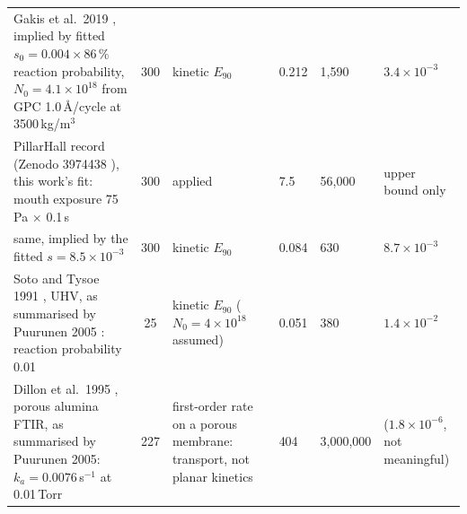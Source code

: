 \documentclass[11pt,letterpaper]{article}
\begin{document}
\begin{table}[tbp]
\begin{tabular}{P{2.15in}cP{0.9in}P{0.65in}P{0.7in}P{0.85in}}
Gakis et al.\ 2019 \cite{gakis2019}, implied by fitted $s_0 = 0.004 \times 86$\,\% reaction probability, $N_0 = 4.1\times10^{18}$ from GPC 1.0\,\AA/cycle at 3500\,kg/m$^3$ & 300 & kinetic $E_{90}$ & 0.212 & 1,590 & $3.4\times10^{-3}$ \\
PillarHall record (Zenodo 3974438 \cite{zenodo3974438}), this work's fit: mouth exposure 75\,Pa $\times$ 0.1\,s & 300 & applied & 7.5 & 56,000 & upper bound only \\
same, implied by the fitted $s = 8.5\times10^{-3}$ & 300 & kinetic $E_{90}$ & 0.084 & 630 & $8.7\times10^{-3}$ \\
Soto and Tysoe 1991 \cite{soto1991}, UHV, as summarised by Puurunen 2005 \cite{puurunen2005}: reaction probability 0.01 & 25 & kinetic $E_{90}$ ($N_0 = 4\times10^{18}$ assumed) & 0.051 & 380 & $1.4\times10^{-2}$ \\
Dillon et al.\ 1995 \cite{dillon1995}, porous alumina FTIR, as summarised by Puurunen 2005: $k_a = 0.0076$\,s$^{-1}$ at 0.01\,Torr & 227 & first-order rate on a porous membrane: transport, not planar kinetics & 404 & 3,000,000 & ($1.8\times10^{-6}$, not meaningful) \\
\bottomrule
\end{tabular}
\end{table}
\end{document}
